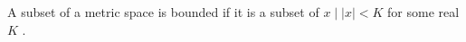 A subset of a metric space is bounded if it is a
subset of  $  {x \mid |x|<K } $  for some real  $ K $ .